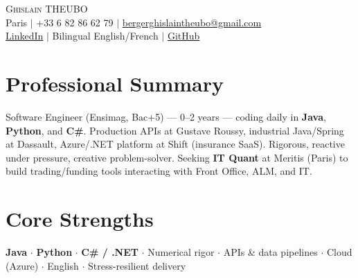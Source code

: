 \documentclass[letterpaper,10.5pt]{article}
\begin{document}
\begin{center}
{\Huge \scshape Ghislain THEUBO} \\ \vspace{2pt}
\small Paris $|$ +33 6 82 86 62 79 $|$ \href{mailto:bergerghislaintheubo@gmail.com}{bergerghislaintheubo@gmail.com} \\
\href{https://www.linkedin.com/in/berger-ghislain}{LinkedIn} $|$ Bilingual English/French $|$ \href{https://github.com/Bergerghislain}{GitHub}
\end{center}
\vspace{-6pt}
\section{Professional Summary}
\small{Software Engineer (Ensimag, Bac+5) --- 0--2 years --- coding daily in \textbf{Java}, \textbf{Python}, and \textbf{C\#}. Production APIs at Gustave Roussy, industrial Java/Spring at Dassault, Azure/.NET platform at Shift (insurance SaaS). Rigorous, reactive under pressure, creative problem-solver. Seeking \textbf{IT Quant} at Meritis (Paris) to build trading/funding tools interacting with Front Office, ALM, and IT.}
\section{Core Strengths}
\small{\textbf{Java} $\cdot$ \textbf{Python} $\cdot$ \textbf{C\# / .NET} $\cdot$ Numerical rigor $\cdot$ APIs \& data pipelines $\cdot$ Cloud (Azure) $\cdot$ English $\cdot$ Stress-resilient delivery}
\end{document}
